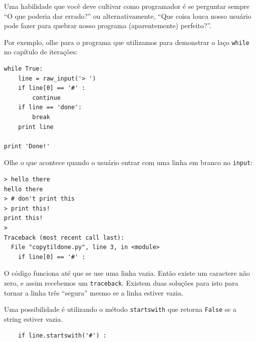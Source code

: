 {%

Uma habilidade que você deve cultivar como programador é se perguntar sempre
``O que poderia dar errado?'' ou alternativamente, ``Que coisa louca nosso
usuário pode fazer para quebrar nosso programa (aparentemente) perfeito?''.


Por exemplo, olhe para o programa que utilizamos para demonstrar o laço
{\tt while} no capítulo de iterações:

\beforeverb
\begin{verbatim}
while True:
    line = raw_input('> ')
    if line[0] == '#' :
        continue
    if line == 'done':
        break
    print line

print 'Done!'
\end{verbatim}
\afterverb
%
%
Olhe o que acontece quando o usuário entrar com uma linha em branco no
{\tt input}:
\beforeverb
\begin{verbatim}
> hello there
hello there
> # don't print this
> print this!
print this!
>
Traceback (most recent call last):
  File "copytildone.py", line 3, in <module>
    if line[0] == '#' :
\end{verbatim}
\afterverb
%
%
O código funciona até que se use uma linha vazia. Então existe um caractere
não zero, e assim recebemos um {\tt traceback}. Existem duas soluções para isto
para tornar a linha três ``segura'' mesmo se a linha estiver vazia.


Uma possibilidade é utilizando o método {\tt startswith} que retorna
{\tt False} se a string estiver vazia.

\beforeverb
\begin{verbatim}
    if line.startswith('#') :
\end{verbatim}
\afterverb
%

}
